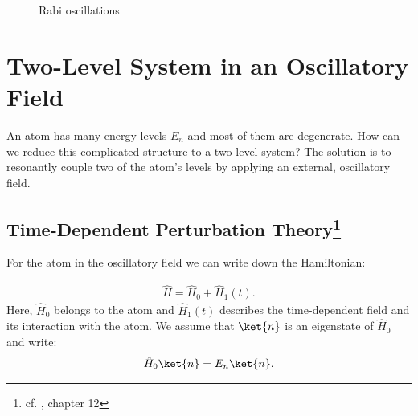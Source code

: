 				\begin{figure}
					\begin{center}
						\caption{Rabi oscillations}
					\end{center}
				\end{figure}
	\section{Two-Level System in an Oscillatory Field}
		An atom has many energy levels $E_n$ and most of them are degenerate. How can we reduce this complicated structure to a two-level system?
		The solution is to resonantly couple two of the atom's levels by applying an external, oscillatory field.

		\subsection[Time-Dependent Perturbation Theory]{Time-Dependent Perturbation Theory\footnote{cf. \cite{basdevant}, chapter 12}} \label{sec:tdperturbationtheory}
			For the atom in the oscillatory field we can write down the Hamiltonian:

			\begin{align}
				\hat{H} = \hat{H}_0 + \hat{H}_1(t).
			\end{align}
			Here, $\hat{H}_0$ belongs to the atom and $\hat{H}_1(t)$ describes the time-dependent field and its interaction with the atom.
			We assume that $\ket{n}$ is an eigenstate of $\hat{H}_0$ and write:
			\begin{align}
				\hat{H}_0\ket{n} = E_n \ket{n}.
			\end{align}
			
